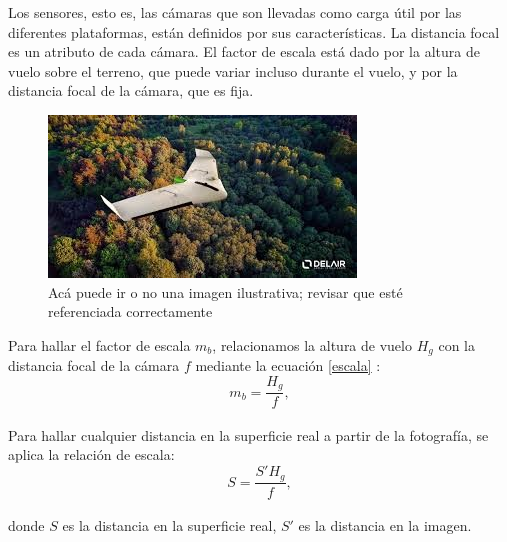 Los sensores, esto es, las cámaras que son llevadas como carga útil por las diferentes plataformas, están definidos por sus características. La distancia focal es un atributo de cada cámara. El factor de escala está dado por la altura de vuelo sobre el terreno, que puede variar incluso durante el vuelo, y por la distancia focal de la cámara, que es fija. 
\begin{figure}
    \includegraphics[width=\textwidth]{Imagenes/dron.jpg}
     \hfill
     \caption{Acá puede ir o no una imagen ilustrativa; revisar que esté referenciada correctamente}
    \label{dron}
\end{figure}
Para hallar el factor de escala $m_b$, relacionamos la altura de vuelo $H_g$ con la distancia focal
de la cámara $f$ mediante la ecuación \ref{escala} \cite{linder_digital_2016}:
\\
\begin{equation}
	m_b=\frac{H_g}{f},\label{escala}
\end{equation}
\\
Para hallar cualquier distancia en la superficie real a partir de la fotografía, se aplica la relación de escala:
\\
\begin{equation}
	S=\frac{S'H_g}{f},\label{escala1}
\end{equation}
\\
donde $S$ es la distancia en la superficie real, $S'$ es la distancia en la imagen.
